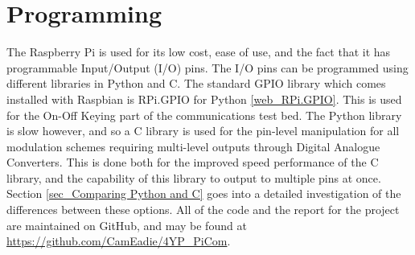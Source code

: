\documentclass[../main.tex]{subfiles}
\begin{document}
\clearpage


\section{Programming}

The Raspberry Pi is used for its low cost, ease of use, and the fact that it has programmable Input/Output (I/O) pins.
The I/O pins can be programmed using different libraries in Python and C.
The standard GPIO library which comes installed with Raspbian is RPi.GPIO for Python \ref{web_RPi.GPIO}.
This is used for the On-Off Keying part of the communications test bed.
The Python library is slow however, and so a C library is used for the pin-level manipulation for all modulation schemes requiring multi-level outputs through Digital Analogue Converters.
This is done both for the improved speed performance of the C library, and the capability of this library to output to multiple pins at once.
Section \ref{sec_Comparing Python and C} goes into a detailed  investigation of the differences between these options.
All of the code and the report for the project are maintained on GitHub, and may be found at \url{https://github.com/CamEadie/4YP_PiCom}.\\
\end{document}
